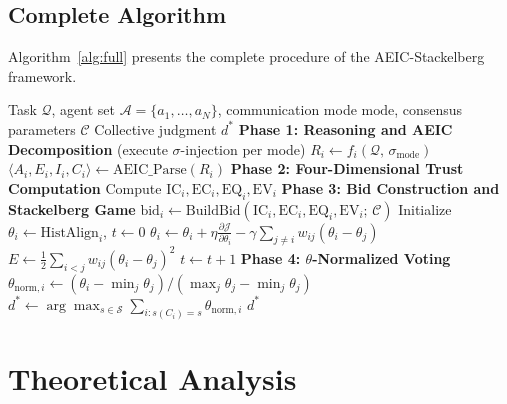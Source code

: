 \documentclass[12pt,a4paper]{article}
\begin{document}
\subsection{Complete Algorithm}\label{sec:algorithm}

Algorithm~\ref{alg:full} presents the complete procedure of the AEIC-Stackelberg framework.

\begin{algorithm}[H]
\caption{AEIC-Stackelberg Decentralized Semantic Consensus}\label{alg:full}
\begin{algorithmic}[1]
\Require Task $\mathcal{Q}$, agent set $\mathcal{A} = \{a_1, \ldots, a_N\}$, communication mode $\text{mode}$, consensus parameters $\mathcal{C}$
\Ensure Collective judgment $d^*$
\State \textbf{Phase 1: Reasoning and AEIC Decomposition} (execute $\sigma$-injection per mode)
    \State $R_i \gets f_i(\mathcal{Q},\, \sigma_{\text{mode}})$ 
    \State $\langle A_i, E_i, I_i, C_i \rangle \gets \text{AEIC\_Parse}(R_i)$ 
\EndFor
\State \textbf{Phase 2: Four-Dimensional Trust Computation}
    \State Compute $\text{IC}_i, \text{EC}_i, \text{EQ}_i, \text{EV}_i$ 
\EndFor
\State \textbf{Phase 3: Bid Construction and Stackelberg Game}
    \State $\text{bid}_i \gets \text{BuildBid}(\text{IC}_i, \text{EC}_i, \text{EQ}_i, \text{EV}_i;\, \mathcal{C})$ 
\EndFor
\State Initialize $\theta_i \gets \text{HistAlign}_i$, $t \gets 0$
\Repeat
     
        \State $\theta_i \gets \theta_i + \eta \frac{\partial \mathcal{J}}{\partial \theta_i} - \gamma \sum_{j \neq i} w_{ij}(\theta_i - \theta_j)$
    \EndFor
    \State $E \gets \frac{1}{2}\sum_{i<j} w_{ij}(\theta_i - \theta_j)^2$
    \State $t \gets t + 1$
\State \textbf{Phase 4: $\theta$-Normalized Voting}
\State $\theta_{\text{norm},i} \gets (\theta_i - \min_j \theta_j) / (\max_j \theta_j - \min_j \theta_j)$
\State $d^* \gets \arg\max_{s \in \mathcal{S}} \sum_{i: s(C_i)=s} \theta_{\text{norm},i}$
\State \Return $d^*$
\end{algorithmic}
\end{algorithm}

\section{Theoretical Analysis}\label{sec:theory}
\end{document}
